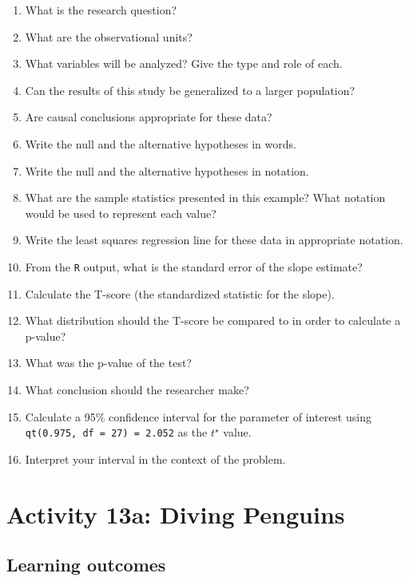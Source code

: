\documentclass[
]{report}
\newcommand{\rgs}{\vspace{12pt}} %
\begin{document}
\begin{enumerate}
\def\labelenumi{\arabic{enumi}.}
\item
  What is the research question?
  \rgs
\item
  What are the observational units?
  \rgs
\item
  What variables will be analyzed? Give the type and role of each.
  \rgs
  \rgs
\item
  Can the results of this study be generalized to a larger population?
  \rgs
\item
  Are causal conclusions appropriate for these data?
  \rgs
\item
  Write the null and the alternative hypotheses in words.
  \rgs
  \rgs
\item
  Write the null and the alternative hypotheses in notation.
  \rgs
\item
  What are the sample statistics presented in this example? What notation would be used to represent each value?
  \rgs
\item
  Write the least squares regression line for these data in appropriate notation.
  \rgs
\item
  From the \texttt{R} output, what is the standard error of the slope estimate?
  \rgs
\item
  Calculate the T-score (the standardized statistic for the slope).
  \rgs
  \rgs
\item
  What distribution should the T-score be compared to in order to calculate a p-value?
  \rgs
\item
  What was the p-value of the test?
  \rgs
\item
  What conclusion should the researcher make?
  \rgs
  \rgs
\item
  Calculate a 95\% confidence interval for the parameter of interest using \texttt{qt(0.975,\ df\ =\ 27)\ =\ 2.052} as the \(t^\star\) value.
  \rgs
  \rgs
\item
  Interpret your interval in the context of the problem.
  \rgs
  \rgs
\end{enumerate}

\newpage

\hypertarget{activity-13a-diving-penguins}{%
\section{Activity 13a: Diving Penguins}\label{activity-13a-diving-penguins}}


\hypertarget{learning-outcomes-7}{%
\subsection{Learning outcomes}\label{learning-outcomes-7}}
\end{document}
